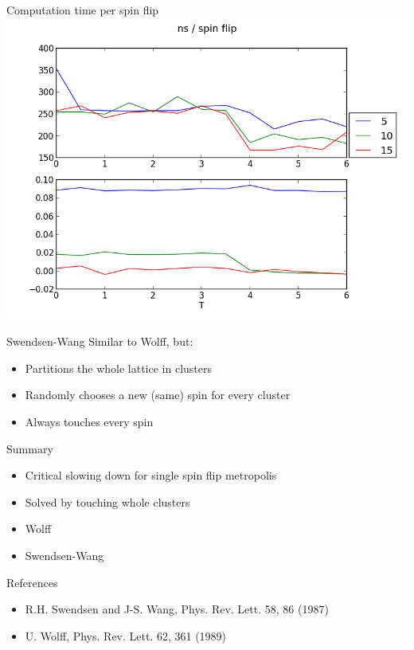 \documentclass[]{beamer}
\begin{document}
\begin{frame}{Computation time per spin flip}
\includegraphics[width=\textwidth]{../results/measurements/nsPerSpinFlip.png}
\note{ }
\end{frame}

\begin{frame}{Swendsen-Wang}
Similar to Wolff, but:
\begin{itemize}
\item<2-> Partitions the whole lattice in clusters
\item<3-> Randomly chooses a new (same) spin for every cluster
\item<4-> Always touches every spin
\end{itemize}
\note{ }
\end{frame}

\begin{frame}{Summary}
\begin{itemize}
\item<2-> Critical slowing down for single spin flip metropolis
\item<3-> Solved by touching whole clusters
\item<4-> Wolff
\item<5-> Swendsen-Wang
\end{itemize}
\note{ }
\end{frame}

\begin{frame}{References}
\begin{itemize}
\item R.H. Swendsen and J-S. Wang, Phys. Rev. Lett. 58, 86 (1987)
\item U. Wolff, Phys. Rev. Lett. 62, 361 (1989)
\end{itemize}
\note{ }
\end{frame}
\end{document}
